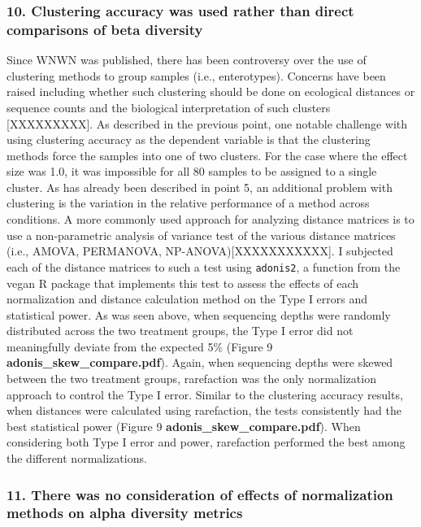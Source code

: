 \documentclass[
]{article}
\begin{document}
\hypertarget{clustering-accuracy-was-used-rather-than-direct-comparisons-of-beta-diversity}{%
\subsubsection{10. Clustering accuracy was used rather than direct
comparisons of beta
diversity}\label{clustering-accuracy-was-used-rather-than-direct-comparisons-of-beta-diversity}}

Since WNWN was published, there has been controversy over the use of
clustering methods to group samples (i.e., enterotypes). Concerns have
been raised including whether such clustering should be done on
ecological distances or sequence counts and the biological
interpretation of such clusters {[}XXXXXXXXX{]}. As described in the
previous point, one notable challenge with using clustering accuracy as
the dependent variable is that the clustering methods force the samples
into one of two clusters. For the case where the effect size was 1.0, it
was impossible for all 80 samples to be assigned to a single cluster. As
has already been described in point 5, an additional problem with
clustering is the variation in the relative performance of a method
across conditions. A more commonly used approach for analyzing distance
matrices is to use a non-parametric analysis of variance test of the
various distance matrices (i.e., AMOVA, PERMANOVA,
NP-ANOVA){[}XXXXXXXXXXX{]}. I subjected each of the distance matrices to
such a test using \texttt{adonis2}, a function from the vegan R package
that implements this test to assess the effects of each normalization
and distance calculation method on the Type I errors and statistical
power. As was seen above, when sequencing depths were randomly
distributed across the two treatment groups, the Type I error did not
meaningfully deviate from the expected 5\% (Figure 9
\textbf{adonis\_skew\_compare.pdf}). Again, when sequencing depths were
skewed between the two treatment groups, rarefaction was the only
normalization approach to control the Type I error. Similar to the
clustering accuracy results, when distances were calculated using
rarefaction, the tests consistently had the best statistical power
(Figure 9 \textbf{adonis\_skew\_compare.pdf}). When considering both
Type I error and power, rarefaction performed the best among the
different normalizations.

\hypertarget{there-was-no-consideration-of-effects-of-normalization-methods-on-alpha-diversity-metrics}{%
\subsubsection{11. There was no consideration of effects of
normalization methods on alpha diversity
metrics}\label{there-was-no-consideration-of-effects-of-normalization-methods-on-alpha-diversity-metrics}}
\end{document}
